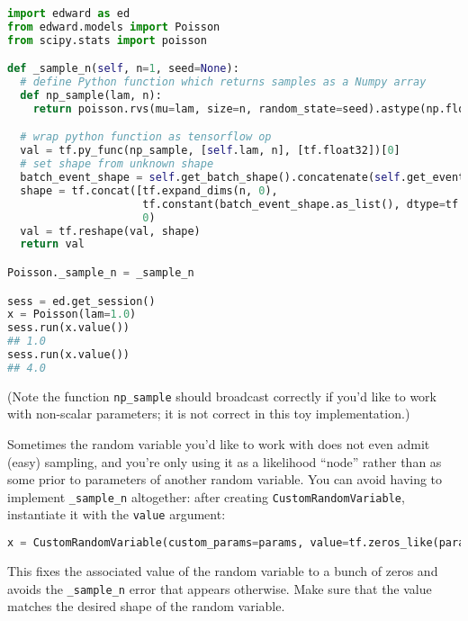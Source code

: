 \begin{lstlisting}[language=Python]
import edward as ed
from edward.models import Poisson
from scipy.stats import poisson

def _sample_n(self, n=1, seed=None):
  # define Python function which returns samples as a Numpy array
  def np_sample(lam, n):
    return poisson.rvs(mu=lam, size=n, random_state=seed).astype(np.float32)

  # wrap python function as tensorflow op
  val = tf.py_func(np_sample, [self.lam, n], [tf.float32])[0]
  # set shape from unknown shape
  batch_event_shape = self.get_batch_shape().concatenate(self.get_event_shape())
  shape = tf.concat([tf.expand_dims(n, 0),
                     tf.constant(batch_event_shape.as_list(), dtype=tf.int32)],
                     0)
  val = tf.reshape(val, shape)
  return val

Poisson._sample_n = _sample_n

sess = ed.get_session()
x = Poisson(lam=1.0)
sess.run(x.value())
## 1.0
sess.run(x.value())
## 4.0
\end{lstlisting}

(Note the function \texttt{np_sample} should broadcast correctly if
you'd like to work with non-scalar parameters; it is not correct in
this toy implementation.)

Sometimes the random variable you'd like to work with does not even
admit (easy) sampling, and you're only using it as a likelihood ``node'' rather
than as some prior to parameters of another random variable.
You can avoid having to implement \texttt{_sample_n} altogether:
after creating \texttt{CustomRandomVariable}, instantiate it with the
\texttt{value} argument:

\begin{lstlisting}[language=Python]
x = CustomRandomVariable(custom_params=params, value=tf.zeros_like(params))
\end{lstlisting}

This fixes the associated value of the random variable to a bunch of
zeros and avoids the \texttt{_sample_n} error that appears otherwise.
Make sure that the value matches the desired shape of the random
variable.
